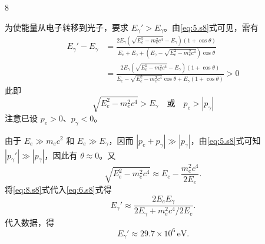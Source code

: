 \begin{solution}{8}
\begin{subsolution}
为使能量从电子转移到光子，要求 $E_\gamma' > E_\gamma$。由\eqref{eq:5.s8}式可见，需有
\begin{align}
E_\gamma' - E_\gamma &= \frac{2 E_\gamma \left(\sqrt{E_e^2 - m_e^2 c^4} - E_\gamma\right)(1 + \cos \theta)}{E_e + E_\gamma + \left(E_\gamma - \sqrt{E_e^2 - m_e^2 c^4}\right) \cos \theta} \nonumber\\
&= \frac{2 E_\gamma \left(\sqrt{E_e^2 - m_e^2 c^4} - E_\gamma\right)(1 + \cos \theta)}{E_e - \sqrt{E_e^2 - m_e^2 c^4} \cos \theta + E_\gamma (1 + \cos \theta)} > 0 \nonumber
\end{align}
此即
\begin{equation}
\sqrt{E_e^2 - m_e^2 c^4} > E_\gamma \quad \text{或} \quad p_e > |p_\gamma|
\label{eq:7.s8}
\end{equation}
注意已设 $p_e > 0$、$p_\gamma < 0$。
\end{subsolution}

\begin{subsolution}
由于 $E_e \gg m_e c^2$ 和 $E_e \gg E_\gamma$，因而 $|p_e + p_\gamma| \gg |p_\gamma|$，由\eqref{eq:5.s8}式可知 $|p_\gamma'| \gg |p_\gamma|$，因此有 $\theta \approx 0$。又
\begin{equation}
\sqrt{E_e^2 - m_e^2 c^4} \approx E_e - \frac{m_e^2 c^4}{2E_e}.
\label{eq:8.s8}
\end{equation}
将\eqref{eq:8.s8}式代入\eqref{eq:6.s8}式得
\begin{equation}
E_\gamma' \approx \frac{2 E_e E_\gamma}{2 E_\gamma + m_e^2 c^4 / 2E_e}.
\label{eq:9.s8}
\end{equation}
代入数据，得
\begin{equation}
E_\gamma' \approx 29.7 \times 10^{6}\,\mathrm{eV}.
\label{eq:10.s8}
\end{equation}
\end{subsolution}
\end{solution}